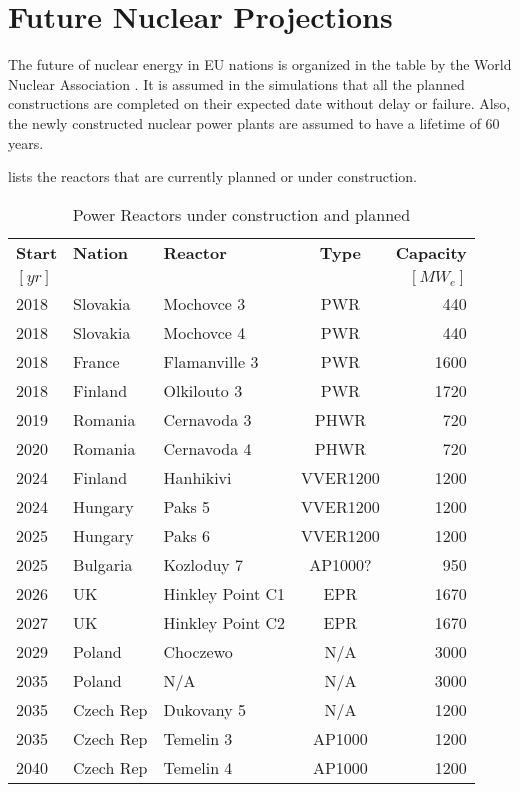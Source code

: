 \section{Future Nuclear Projections}

The future of nuclear energy in \gls{EU} nations is organized
in the table by the World Nuclear Association \cite{world_nuclear_association_nuclear_2017}.
It is assumed in the simulations that all the planned constructions 
are completed on their expected date without delay
or failure. Also, the newly constructed nuclear power plants are assumed to have a lifetime of 60 years.

 lists the reactors that are currently  planned or under construction.

 
\begin{table}[h]
	\centering
	\caption {Power Reactors under construction and planned \cite{world_nuclear_association_nuclear_2017}}
	\label{tab:eu_deployment}
	\begin{tabular}{lllcr}
		\hline
                \textbf{Start} & \textbf{Nation} & \textbf{Reactor} & \textbf{Type} & \textbf{Capacity}\\
                $[yr]$ & & & & $[MW_e]$\\
		\hline
		2018 & Slovakia  & Mochovce 3 & PWR & 440\\
		2018 & Slovakia & Mochovce 4 & PWR & 440 \\
		2018 & France & Flamanville 3 & PWR & 1600 \\
		2018 & Finland & Olkilouto 3 & PWR & 1720 \\		
		2019 & Romania & Cernavoda 3 & PHWR & 720 \\
		2020 & Romania & Cernavoda 4 & PHWR & 720 \\
		2024 & Finland & Hanhikivi & VVER1200 & 1200 \\
		2024 & Hungary & Paks 5 & VVER1200 & 1200 \\
		2025 & Hungary & Paks 6 & VVER1200 & 1200 \\
		2025 & Bulgaria & Kozloduy 7 & AP1000? & 950 \\
		2026 & UK & Hinkley Point C1 & EPR & 1670 \\
		2027 & UK & Hinkley Point C2 & EPR & 1670 \\
		2029 & Poland & Choczewo & N/A & 3000 \\
		2035 & Poland & N/A & N/A & 3000 \\
		2035 & Czech Rep & Dukovany 5 & N/A & 1200 \\
		2035 & Czech Rep & Temelin 3 & AP1000 & 1200 \\
		2040 & Czech Rep & Temelin 4 & AP1000 & 1200 \\
		\hline
	\end{tabular}
\end{table}
\FloatBarrier

